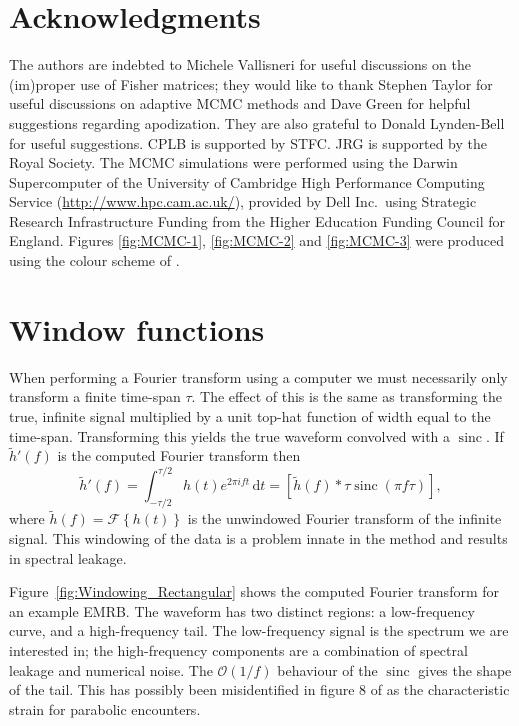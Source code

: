 \documentclass[useAMS,usedcolumn,usegraphicx,usenatbib]{mn2e}
\newcommand{\Figref}[1]{Figure~\ref{fig:#1}}
\DeclareMathOperator{\sinc}{sinc}
\newcommand{\dd}{\ensuremath{\mathrm{d}}}
\newcommand{\intd}[4]{\ensuremath{\int_{#1}^{#2}{#3}\,\dd{#4}}}
\newcommand{\order}[1]{\ensuremath{\mathcal{O}({#1})}}
\begin{document}
\section*{Acknowledgments}

The authors are indebted to Michele Vallisneri for useful discussions on the (im)proper use of Fisher matrices; they would like to thank Stephen Taylor for useful discussions on adaptive MCMC methods and Dave Green for helpful suggestions regarding apodization. They are also grateful to Donald Lynden-Bell for useful suggestions. CPLB is supported by STFC. JRG is supported by the Royal Society. The MCMC simulations were performed using the Darwin Supercomputer of the University of Cambridge High Performance Computing Service (\url{http://www.hpc.cam.ac.uk/}), provided by Dell Inc.\ using Strategic Research Infrastructure Funding from the Higher Education Funding Council for England. Figures \ref{fig:MCMC-1}, \ref{fig:MCMC-2} and \ref{fig:MCMC-3} were produced using the colour scheme of \citet{Green2011}.




\appendix

\section{Window functions}\label{ap:window}

When performing a Fourier transform using a computer we must necessarily only transform a finite time-span $\tau$. The effect of this is the same as transforming the true, infinite signal multiplied by a unit top-hat function of width equal to the time-span. Transforming this yields the true waveform convolved with a $\sinc$. If $\tilde{h}'(f)$ is the computed Fourier transform then
\begin{equation}
\tilde{h}'(f) = \intd{-\tau/2}{\tau/2}{h(t)e^{2\pi i ft}}{t} = \left[\tilde{h}(f) \ast \tau \sinc(\pi f\tau)\right],
\end{equation}
where $\tilde{h}(f) = \mathscr{F}\left\{h(t)\right\}$ is the unwindowed Fourier transform of the infinite signal. This windowing of the data is a problem innate in the method and results in spectral leakage.

\Figref{Windowing_Rectangular} shows the computed Fourier transform for an example EMRB. The waveform has two distinct regions: a low-frequency curve, and a high-frequency tail. The low-frequency signal is the spectrum we are interested in; the high-frequency components are a combination of spectral leakage and numerical noise. The $\order{1/{f}}$ behaviour of the $\sinc$ gives the shape of the tail. This has possibly been misidentified in figure 8 of \citet{Burko2007} as the characteristic strain for parabolic encounters.
\end{document}
